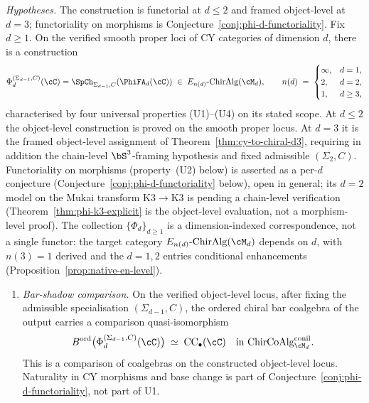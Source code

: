 \begin{theorem}
\label{thm:phi-platonic}
\noindent\emph{Hypotheses.} The construction is functorial at $d \leq 2$ and framed object-level at $d = 3$; functoriality on morphisms is Conjecture~\ref{conj:phi-d-functoriality}.
Fix $d \geq 1$. On the verified smooth proper loci of CY categories of dimension $d$, there is a construction
\[
 \Phi_d^{(\Sigma_{d-1},C)}(\cC)
 =
 \SpCh_{\Sigma_{d-1},C}(\PhiFA_d(\cC))
 \;\in\; E_{n(d)}\text{-}\mathrm{ChirAlg}(\cM_d),
 \qquad n(d) \;=\;
 \begin{cases} \infty, & d = 1, \\ 2, & d = 2, \\ 1, & d \geq 3, \end{cases}
\]
characterised by four universal properties \textup{(U1)--(U4)} on its stated scope. At $d\leq2$ the object-level construction is proved on the smooth proper locus. At $d=3$ it is the framed object-level assignment of Theorem~\ref{thm:cy-to-chiral-d3}, requiring in addition the chain-level $\bS^3$-framing hypothesis and fixed admissible $(\Sigma_2,C)$. Functoriality on morphisms \textup{(}property~\textup{(U2)} below\textup{)} is asserted as a per-$d$ conjecture \textup{(}Conjecture~\textup{\ref{conj:phi-d-functoriality}} below\textup{),} open in general; its $d = 2$ model on the Mukai transform $\mathrm{K3} \to \mathrm{K3}$ is pending a chain-level verification \textup{(}Theorem~\textup{\ref{thm:phi-k3-explicit}} is the object-level evaluation, not a morphism-level proof\textup{)}. The collection $\{\Phi_d\}_{d \geq 1}$ is a dimension-indexed correspondence, not a single functor: the target category $E_{n(d)}\text{-}\mathrm{ChirAlg}(\cM_d)$ depends on $d$, with $n(3) = 1$ derived and the $d = 1, 2$ entries conditional enhancements \textup{(}Proposition~\ref{prop:native-en-level}\textup{)}.
\begin{enumerate}[label=\textup{(U\arabic*)}]
 \item\label{phi:U1} \emph{Bar-shadow comparison.} On the verified
 object-level locus, after fixing the admissible specialisation
 $(\Sigma_{d-1}, C)$, the ordered chiral bar coalgebra of the output
 carries a comparison quasi-isomorphism
 \[
 B^{\mathrm{ord}}\bigl(\Phi_d^{(\Sigma_{d-1}, C)}(\cC)\bigr)
 \;\simeq\; \mathrm{CC}_\bullet(\cC)
 \quad \text{in } \mathrm{ChirCoAlg}^{\mathrm{conil}}_{\cM_d}.
 \]
 This is a comparison of coalgebras on the constructed object-level
 locus. Naturality in CY morphisms and base change is part of
 Conjecture~\textup{\ref{conj:phi-d-functoriality}}, not part of U1.

\end{enumerate}
\end{theorem}
